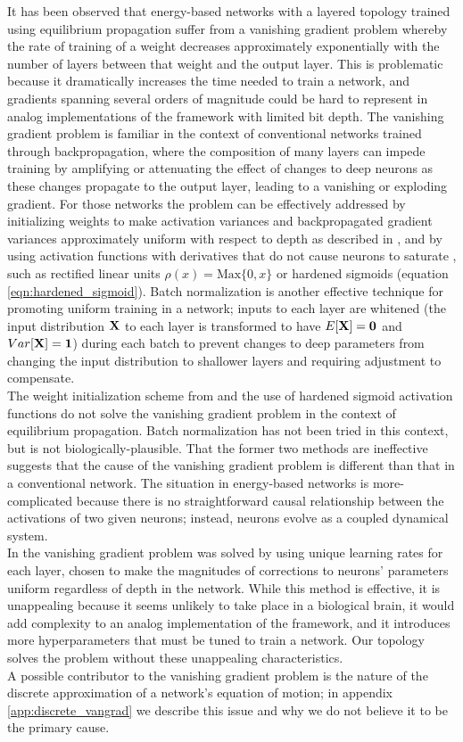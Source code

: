 \documentclass[format=sigconf]{acmart}
\newcommand{\npar}{\\\indent}
\begin{document}
It has been observed \cite{scellier17} that energy-based networks with a layered topology trained using equilibrium propagation suffer from a vanishing gradient problem whereby the rate of training of a weight decreases approximately exponentially with the number of layers between that weight and the output layer. This is problematic because it dramatically increases the time needed to train a network, and gradients spanning several orders of magnitude could be hard to represent in analog implementations of the framework with limited bit depth. The vanishing gradient problem is familiar in the context of conventional networks trained through backpropagation, where the composition of many layers can impede training by amplifying or attenuating the effect of changes to deep neurons as these changes propagate to the output layer, leading to a vanishing or exploding gradient. For those networks the problem can be effectively addressed by initializing weights to make activation variances and backpropagated gradient variances approximately uniform with respect to depth as described in \cite{glorot2010}, and by using activation functions with derivatives that do not cause neurons to saturate \cite{schmidhuber2015}, such as rectified linear units $\rho(x)=\text{Max}\{0, x\}$ or hardened sigmoids (equation \ref{eqn:hardened_sigmoid}). Batch normalization \cite{ioffe2015} is another effective technique for promoting uniform training in a network; inputs to each layer are whitened (the input distribution $\bf{X}$ to each layer is transformed to have $E[\bf{X}]=0$ and $Var[\bf{X}]=1$) during each batch to prevent changes to deep parameters from changing the input distribution to shallower layers and requiring adjustment to compensate.
\npar
The weight initialization scheme from \cite{glorot2010} and the use of hardened sigmoid activation functions do not solve the vanishing gradient problem in the context of equilibrium propagation. Batch normalization has not been tried in this context, but is not biologically-plausible. That the former two methods are ineffective suggests that the cause of the vanishing gradient problem is different than that in a conventional network. The situation in energy-based networks is more-complicated because there is no straightforward causal relationship between the activations of two given neurons; instead, neurons evolve as a coupled dynamical system.
\npar
In \cite{scellier17} the vanishing gradient problem was solved by using unique learning rates for each layer, chosen to make the magnitudes of corrections to neurons' parameters uniform regardless of depth in the network. While this method is effective, it is unappealing because it seems unlikely to take place in a biological brain, it would add complexity to an analog implementation of the framework, and it introduces more hyperparameters that must be tuned to train a network. Our topology solves the problem without these unappealing characteristics.
\npar
A possible contributor to the vanishing gradient problem is the nature of the discrete approximation of a network's equation of motion; in appendix \ref{app:discrete_vangrad} we describe this issue and why we do not believe it to be the primary cause.
\end{document}
